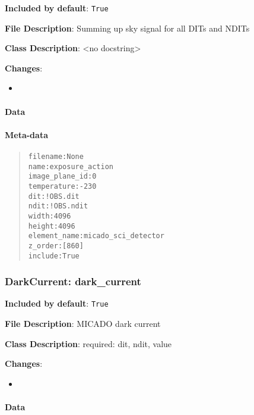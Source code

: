 \textbf{Included by default}: \texttt{True}

\textbf{File Description}: Summing up sky signal for all DITs and NDITs

\textbf{Class Description}: <no docstring>

\textbf{Changes}:

\begin{itemize}
\item \end{itemize}


\paragraph{Data%
  \label{id3}%
}


\paragraph{Meta-data%
  \label{id4}%
}

\begin{quote}
\begin{alltt}
      filename : None
          name : exposure_action
image_plane_id : 0
   temperature : -230
           dit : !OBS.dit
          ndit : !OBS.ndit
         width : 4096
        height : 4096
  element_name : micado_sci_detector
       z_order : [860]
       include : True
\end{alltt}
\end{quote}


\subsubsection{DarkCurrent: \textquotedbl{}dark\_current\textquotedbl{}%
  \label{darkcurrent-dark-current}%
}

\textbf{Included by default}: \texttt{True}

\textbf{File Description}: MICADO dark current

\textbf{Class Description}: required: dit, ndit, value

\textbf{Changes}:

\begin{itemize}
\item \end{itemize}


\paragraph{Data%
  \label{id5}%
}



